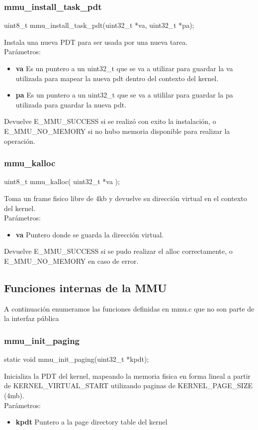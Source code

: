 \subsubsection{mmu\_install\_task\_pdt}
\begin{verbatimtab}
 uint8_t mmu_install_task_pdt(uint32_t *va, uint32_t *pa);
\end{verbatimtab}
Instala una nueva PDT para ser usada por una nueva tarea.\\
Parámetros:
\begin{itemize}
 \item \textbf{va} Es un puntero a un uint32\_t que se va a utilizar para guardar la va utilizada para mapear la nueva pdt dentro del contexto del kernel.
 \item \textbf{pa} Es un puntero a un uint32\_t que se va a utililar para guardar la pa utilizada para guardar la nueva pdt.
\end{itemize}
Devuelve E\_MMU\_SUCCESS si se realizó con exito la instalación, o E\_MMU\_NO\_MEMORY si no hubo memoria disponible para realizar la operación.

\subsubsection{mmu\_kalloc}
\begin{verbatimtab}
 uint8_t mmu_kalloc( uint32_t *va );
\end{verbatimtab}
Toma un frame fisico libre de 4kb y devuelve su dirección virtual en el contexto del kernel.\\
Parámetros:
\begin{itemize}
  \item \textbf{va}  Puntero donde se guarda la dirección virtual.
\end{itemize}
Devuelve E\_MMU\_SUCCESS si se pudo realizar el alloc correctamente, o E\_MMU\_NO\_MEMORY en caso de error.


\subsection{Funciones internas de la MMU}
A continuación enumeramos las funciones definidas en mmu.c que no son parte de la interfaz pública

\subsubsection{mmu\_init\_paging}
\begin{verbatimtab}
static void mmu_init_paging(uint32_t *kpdt);
\end{verbatimtab}
Inicializa la PDT del kernel, mapeando la memoria fisica en forma lineal a partir 
de KERNEL\_VIRTUAL\_START utilizando paginas de KERNEL\_PAGE\_SIZE (4mb). \\
Parámetros:
\begin{itemize}
 \item \textbf{kpdt} Puntero a la page directory table del kernel
\end{itemize}

